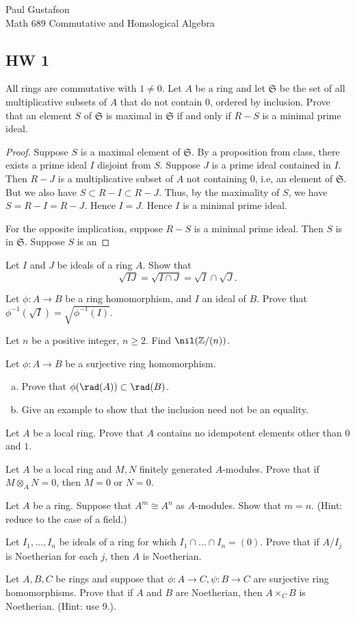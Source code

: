 \documentclass{article}
\begin{document}
\noindent Paul Gustafson\\
\noindent Math 689 Commutative and Homological Algebra

\subsection*{HW 1}
All rings are commutative with $1 \neq 0$.
 Let $A$ be a ring and let $\mathfrak S$ be the set of all multiplicative subsets of $A$ that do not contain $0$, ordered by inclusion.  Prove that an element $S$ of $\mathfrak S$ is maximal in $\mathfrak S$ if and only if $R - S$ is a minimal prime ideal.
\begin{proof}
Suppose $S$ is a maximal element of $\mathfrak S$. By a proposition from class, there exists a prime ideal $I$ disjoint from $S$.  Suppose $J$ is a prime ideal contained in $I$.  Then $R - J$ is a multiplicative subset of $A$ not containing $0$, i.e, an element of $\mathfrak S$.  But we also have $S \subset R - I \subset R -J$. Thus, by the maximality of $S$, we have $S = R - I = R - J$.  Hence $I = J$. Hence $I$ is a minimal prime ideal.

For the opposite implication, suppose $R - S$ is a minimal prime ideal. Then $S$ is in $\mathfrak S$.  Suppose $S$ is an 

\end{proof}

 Let $I$ and $J$ be ideals of a ring $A$. Show that 
$$\sqrt{IJ} = \sqrt{ I \cap J }   = \sqrt I \cap \sqrt J .$$

 Let $\phi: A \to B$ be a ring homomorphism, and $I$ an ideal of $B$. Prove that $\phi^{-1}(\sqrt I) = \sqrt{\phi^{-1}(I)}$.

 Let $n$ be a positive integer, $n \ge 2$. Find $\nil(\Z/(n))$.

 Let $\phi: A \to B$ be a surjective ring homomorphism.
\begin{enumerate}[(a)]
\item Prove that $\phi(\rad(A)) \subset \rad(B)$.
\item Give an example to show that the inclusion need not be an equality.
\end{enumerate}

 Let $A$ be a local ring.  Prove that $A$ contains no idempotent elements other than $0$ and $1$.

 Let $A$ be a local ring and $M,N$ finitely generated $A$-modules. Prove that if $M \otimes_A  N = 0$, then $M = 0$ or $N = 0$.

 Let $A$ be a ring. Suppose that $A^m \cong A^n$ as $A$-modules.  Show that $m = n$. (Hint: reduce to the case of a field.)

 Let $I_1, \ldots, I_n$ be ideals of a ring for which $I_1 \cap \ldots \cap I_n = (0)$. Prove that if $A/I_j$ is Noetherian for each $j$, then $A$ is Noetherian.

 Let $A, B, C$ be rings and suppose that $\phi: A \to C, \psi: B \to C$ are surjective ring homomorphisms. Prove that if $A$ and $B$ are Noetherian, then $A \times_C B$ is Noetherian. (Hint: use 9.).
\end{document}
